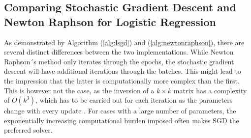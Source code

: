 \documentclass
[twocolumn,
secnumarabic,
nobibnotes,
aps,
prl,
reprint,
groupedaddress,
amsmath,
amssymb
]{revtex4-2}
\begin{document}
\subsection{Comparing Stochastic Gradient Descent and Newton Raphson for Logistic Regression}
As demonstrated by Algorithm (\ref{alg:lsgd}) and (\ref{alg:newtonraphson}), there are several distinct differences between the two implementations. While Newton Raphson´s method only iterates through the epochs, the stochastic gradient descent will have additional iterations through the batches. This might lead to the impression that the latter is computationally more complex than the first. This is however not the case, as the inversion of a $k \times k$ matrix has a complexity of $O(k^3)$, which has to be carried out for each iteration as the parameters change with every update \cite{Goodfellow2016}. For cases with a large number of parameters, the exponentially increasing computational burden imposed often makes SGD the preferred solver.

\end{document}
